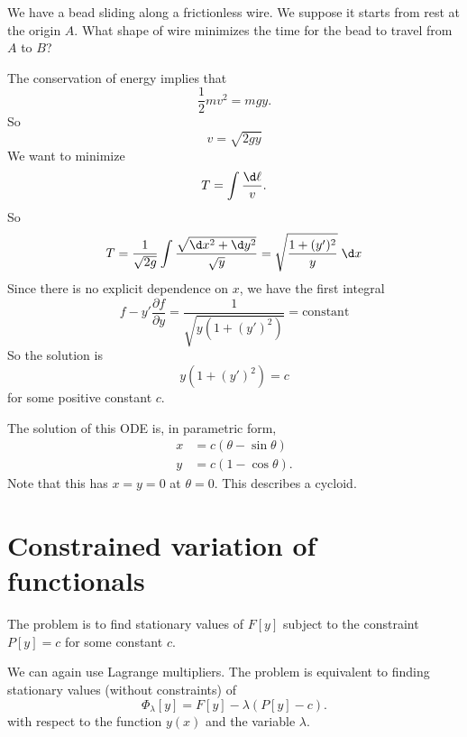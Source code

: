 \documentclass[a4paper]{article}
\begin{document}
\begin{eg}[Branchistochrone]
  We have a bead sliding along a frictionless wire. We suppose it starts from rest at the origin $A$. What shape of wire minimizes the time for the bead to travel from $A$ to $B$?

  \begin{center}
  \end{center}

  The conservation of energy implies that
  \[
    \frac{1}{2}mv^2 = mgy.
  \]
  So
  \[
    v = \sqrt{2gy}
  \]
  We want to minimize
  \[
    T = \int \frac{\d \ell}{v}.
  \]
  So
  \[
    T = \frac{1}{\sqrt{2g}}\int \frac{\sqrt{\d x^2 + \d y^2}}{\sqrt{y}} = \sqrt{\frac{1 + (y')^2}{y}}\;\d x
  \]
  Since there is no explicit dependence on $x$, we have the first integral
  \[
    f - y'\frac{\partial f}{\partial y} = \frac{1}{\sqrt{y(1 + (y')^2)}} = \text{constant}
  \]
  So the solution is
  \[
    y(1 + (y')^2) = c
  \]
  for some positive constant $c$.

  The solution of this ODE is, in parametric form,
  \begin{align*}
    x &= c(\theta - \sin \theta)\\
    y &= c(1 - \cos \theta).
  \end{align*}
  Note that this has $x = y = 0$ at $\theta = 0$. This describes a cycloid.
\end{eg}

\section{Constrained variation of functionals}
The problem is to find stationary values of $F[y]$ subject to the constraint $P[y] = c$ for some constant $c$.

We can again use Lagrange multipliers. The problem is equivalent to finding stationary values (without constraints) of
\[
  \Phi_\lambda [y] = F[y] - \lambda(P[y] - c).
\]
with respect to the function $y(x)$ and the variable $\lambda$.
\end{document}

